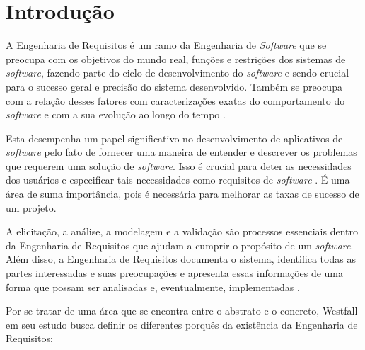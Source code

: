 \chapter[Introdução]{Introdução}

A Engenharia de Requisitos é um ramo da Engenharia de \textit{Software} que se preocupa com os objetivos do mundo real, funções e restrições dos sistemas de \textit{software}, fazendo parte do ciclo de desenvolvimento do \textit{software} e sendo crucial para o sucesso geral e precisão do sistema desenvolvido. Também se preocupa com a relação desses fatores com caracterizações exatas do comportamento do \textit{software} e com a sua evolução ao longo do tempo \cite{elliott2012software}.

Esta desempenha um papel significativo no desenvolvimento de aplicativos de \textit{software} pelo fato de fornecer uma maneira de entender e descrever os problemas que requerem uma solução de \textit{software}. Isso é crucial para deter as necessidades dos usuários e especificar tais necessidades como requisitos de \textit{software} \cite{elliott2012software}. É uma área de suma importância, pois é necessária para melhorar as taxas de sucesso de um projeto.

A elicitação, a análise, a modelagem e a validação são processos essenciais dentro da Engenharia de Requisitos que ajudam a cumprir o propósito de um \textit{software}. Além disso, a Engenharia de Requisitos documenta o sistema, identifica todas as partes interessadas e suas preocupações e apresenta essas informações de uma forma que possam ser analisadas e, eventualmente, implementadas \cite{elliott2012software}.

Por se tratar de uma área que se encontra entre o abstrato e o concreto, Westfall \cite{westfall_5w2h} em seu estudo busca definir os diferentes porquês da existência da Engenharia de Requisitos:

